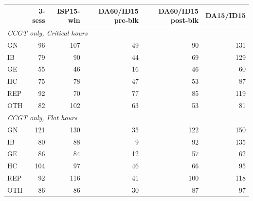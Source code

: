 \begin{tabular}{l r r r r r}
\toprule
 & 3-sess & ISP15-win & DA60/ID15 pre-blk & DA60/ID15 post-blk & DA15/ID15 \\
\midrule
\multicolumn{6}{l}{\textit{CCGT only, Critical hours}} \\
GN & 96 & 107 & 49 & 90 & 131 \\
IB & 79 & 90 & 44 & 69 & 129 \\
GE & 55 & 46 & 16 & 46 & 60 \\
HC & 75 & 78 & 47 & 53 & 87 \\
REP & 92 & 70 & 77 & 85 & 119 \\
OTH & 82 & 102 & 63 & 53 & 81 \\
\midrule
\multicolumn{6}{l}{\textit{CCGT only, Flat hours}} \\
GN & 121 & 130 & 35 & 122 & 150 \\
IB & 80 & 88 & 9 & 92 & 135 \\
GE & 86 & 84 & 12 & 57 & 62 \\
HC & 104 & 97 & 46 & 66 & 95 \\
REP & 92 & 116 & 41 & 100 & 118 \\
OTH & 86 & 86 & 30 & 87 & 97 \\
\midrule
\bottomrule
\end{tabular}
